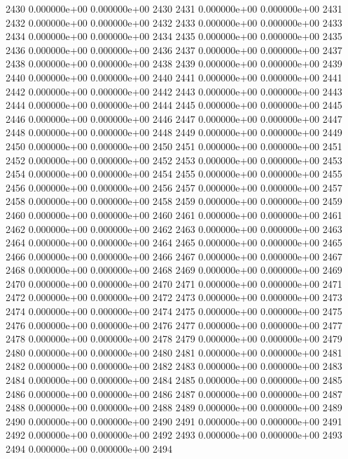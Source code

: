 \documentclass{article}
\begin{document}
\begin{Schunk}
\begin{Soutput}
2430   0.000000e+00   0.000000e+00 2430
2431   0.000000e+00   0.000000e+00 2431
2432   0.000000e+00   0.000000e+00 2432
2433   0.000000e+00   0.000000e+00 2433
2434   0.000000e+00   0.000000e+00 2434
2435   0.000000e+00   0.000000e+00 2435
2436   0.000000e+00   0.000000e+00 2436
2437   0.000000e+00   0.000000e+00 2437
2438   0.000000e+00   0.000000e+00 2438
2439   0.000000e+00   0.000000e+00 2439
2440   0.000000e+00   0.000000e+00 2440
2441   0.000000e+00   0.000000e+00 2441
2442   0.000000e+00   0.000000e+00 2442
2443   0.000000e+00   0.000000e+00 2443
2444   0.000000e+00   0.000000e+00 2444
2445   0.000000e+00   0.000000e+00 2445
2446   0.000000e+00   0.000000e+00 2446
2447   0.000000e+00   0.000000e+00 2447
2448   0.000000e+00   0.000000e+00 2448
2449   0.000000e+00   0.000000e+00 2449
2450   0.000000e+00   0.000000e+00 2450
2451   0.000000e+00   0.000000e+00 2451
2452   0.000000e+00   0.000000e+00 2452
2453   0.000000e+00   0.000000e+00 2453
2454   0.000000e+00   0.000000e+00 2454
2455   0.000000e+00   0.000000e+00 2455
2456   0.000000e+00   0.000000e+00 2456
2457   0.000000e+00   0.000000e+00 2457
2458   0.000000e+00   0.000000e+00 2458
2459   0.000000e+00   0.000000e+00 2459
2460   0.000000e+00   0.000000e+00 2460
2461   0.000000e+00   0.000000e+00 2461
2462   0.000000e+00   0.000000e+00 2462
2463   0.000000e+00   0.000000e+00 2463
2464   0.000000e+00   0.000000e+00 2464
2465   0.000000e+00   0.000000e+00 2465
2466   0.000000e+00   0.000000e+00 2466
2467   0.000000e+00   0.000000e+00 2467
2468   0.000000e+00   0.000000e+00 2468
2469   0.000000e+00   0.000000e+00 2469
2470   0.000000e+00   0.000000e+00 2470
2471   0.000000e+00   0.000000e+00 2471
2472   0.000000e+00   0.000000e+00 2472
2473   0.000000e+00   0.000000e+00 2473
2474   0.000000e+00   0.000000e+00 2474
2475   0.000000e+00   0.000000e+00 2475
2476   0.000000e+00   0.000000e+00 2476
2477   0.000000e+00   0.000000e+00 2477
2478   0.000000e+00   0.000000e+00 2478
2479   0.000000e+00   0.000000e+00 2479
2480   0.000000e+00   0.000000e+00 2480
2481   0.000000e+00   0.000000e+00 2481
2482   0.000000e+00   0.000000e+00 2482
2483   0.000000e+00   0.000000e+00 2483
2484   0.000000e+00   0.000000e+00 2484
2485   0.000000e+00   0.000000e+00 2485
2486   0.000000e+00   0.000000e+00 2486
2487   0.000000e+00   0.000000e+00 2487
2488   0.000000e+00   0.000000e+00 2488
2489   0.000000e+00   0.000000e+00 2489
2490   0.000000e+00   0.000000e+00 2490
2491   0.000000e+00   0.000000e+00 2491
2492   0.000000e+00   0.000000e+00 2492
2493   0.000000e+00   0.000000e+00 2493
2494   0.000000e+00   0.000000e+00 2494

\end{Soutput}
\end{Schunk}
\end{document}
